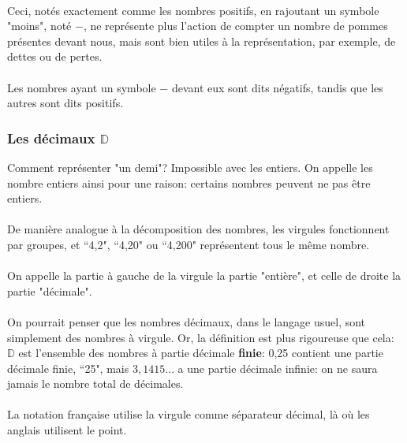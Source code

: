 \documentclass[a4paper]{book}
\begin{document}
    \paragraph{}
    Ceci, notés exactement comme les nombres positifs, en rajoutant un symbole "moins", noté $-$, ne représente plus l'action de compter un nombre de pommes présentes devant nous, mais sont bien utiles à la représentation, par exemple, de dettes ou de pertes.

    \paragraph{}
    Les nombres ayant un symbole $-$ devant eux sont dits négatifs, tandis que les autres sont dits positifs.
    
    \subsubsection{Les décimaux $\mathds{D}$}
    Comment représenter "un demi"? Impossible avec les entiers. On appelle les nombre entiers ainsi pour une raison: certains nombres peuvent ne pas être entiers. 
    \paragraph{}
    De manière analogue à la décomposition des nombres, les virgules fonctionnent par groupes, et ``4,2", ``4,20" ou ``4,200" représentent tous le même nombre.
    \paragraph{}
    On appelle la partie à gauche de la virgule la partie "entière", et celle de droite la partie "décimale".
    \paragraph{}
    On pourrait penser que les nombres décimaux, dans le langage usuel, sont simplement des nombres à virgule. Or, la définition est plus rigoureuse que cela: $\mathds{D}$ est l'ensemble des nombres à partie décimale \textbf{finie}: 0,25 contient une partie décimale finie, ``25", mais $3,1415\dots$ a une partie décimale infinie: on ne saura jamais le nombre total de décimales.
    
    \paragraph{}
    La notation française utilise la virgule comme séparateur décimal, là où les anglais utilisent le point.
    
\end{document}
